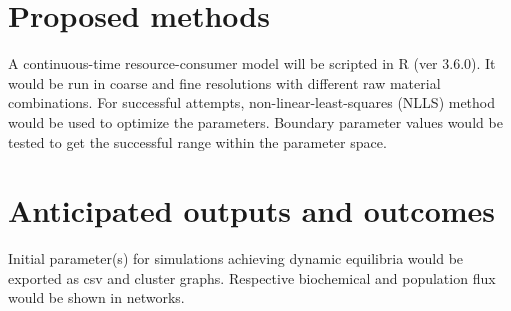 \documentclass[a4paper, 11pt]{article}
\begin{document}
\section{Proposed methods}
A continuous-time resource-consumer model will be scripted in R (ver 3.6.0).  It would be run in coarse and fine resolutions with different raw material combinations.  For successful attempts, non-linear-least-squares (NLLS) method would be used to optimize the parameters.  Boundary parameter values would be tested to get the successful range within the parameter space.
\section{Anticipated outputs and outcomes}
Initial parameter(s) for simulations achieving dynamic equilibria would be exported as csv and cluster graphs.  Respective biochemical and population flux would be shown in networks.
\end{document}
